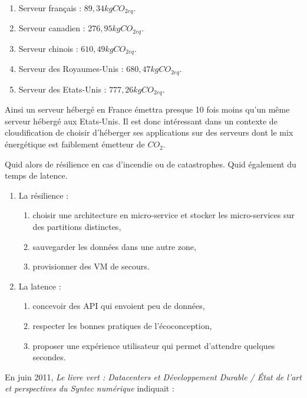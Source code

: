 \begin{enumerate}
\def\labelenumi{\arabic{enumi}.}
\tightlist
\item
  Serveur français : \(89,34 kgCO_{2eq}\).
\item
  Serveur canadien : \(276,95 kgCO_{2eq}\).
\item
  Serveur chinois : \(610,49 kgCO_{2eq}\).
\item
  Serveur des Royaumes-Unis : \(680,47 kgCO_{2eq}\).
\item
  Serveur des Etats-Unis : \(777,26 kgCO_{2eq}\).
\end{enumerate}

Ainsi un serveur hébergé en France émettra presque 10 fois moins qu'un
même serveur hébergé aux Etats-Unis. Il est donc intéressant dans un
contexte de cloudification de choisir d'héberger ses applications sur
des serveurs dont le mix énergétique est faiblement émetteur de
\(CO_2\).

Quid alors de résilience en cas d'incendie ou de catastrophes. Quid
également du temps de latence.

\begin{enumerate}
\def\labelenumi{\arabic{enumi}.}
\tightlist
\item
  La résilience :

  \begin{enumerate}
  \def\labelenumii{\arabic{enumii}.}
  \tightlist
  \item
    choisir une architecture en micro-service et stocker les
    micro-services sur des partitions distinctes,
  \item
    sauvegarder les données dans une autre zone,
  \item
    provisionner des VM de secours.
  \end{enumerate}
\item
  La latence :

  \begin{enumerate}
  \def\labelenumii{\arabic{enumii}.}
  \tightlist
  \item
    concevoir des API qui envoient peu de données,
  \item
    respecter les bonnes pratiques de l'écoconception,
  \item
    proposer une expérience utilisateur qui permet d'attendre quelques
    secondes.
  \end{enumerate}
\end{enumerate}

En juin 2011, \emph{Le livre vert : Datacenters et Développement Durable
/ État de l'art et perspectives du Syntec numérique} indiquait :

